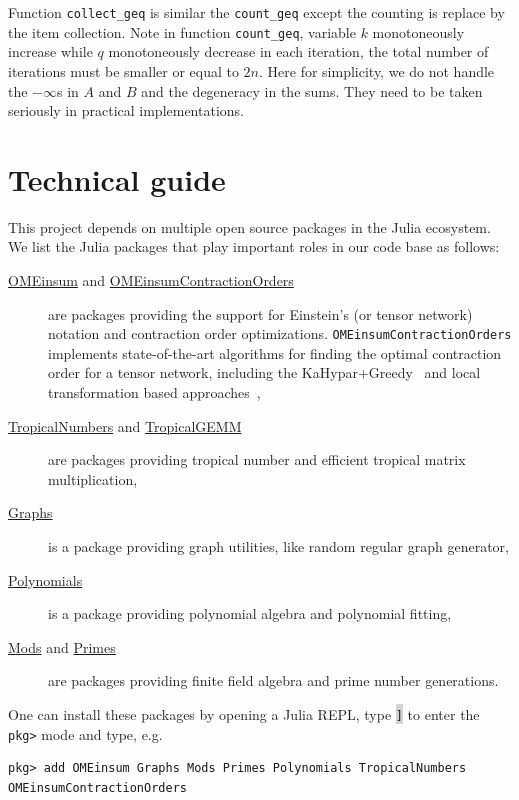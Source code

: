 \documentclass[onefignum, onetabnum]{siamart190516}
\newcommand{\<}{\langle}
\renewcommand{\>}{\rangle}
\begin{document}
Function \texttt{collect\_geq} is similar the \texttt{count\_geq} except the counting is replace by the item collection.
Note in function \texttt{count\_geq}, variable $k$ monotoneously increase while $q$ monotoneously decrease in each iteration,
the total number of iterations must be smaller or equal to $2n$.
Here for simplicity, we do not handle the $-\infty$s in $A$ and $B$ and the degeneracy in the sums.
They need to be taken seriously in practical implementations.

\section{Technical guide}\label{sec:technical}
This project depends on multiple open source packages in the Julia ecosystem.
We list the Julia packages that play important roles in our code base as follows:

\begin{description}
	\item[\href{https://github.com/under-Peter/OMEinsum.jl}{OMEinsum} and \href{https://github.com/Happy-Diode/OMEinsumContractionOrders.jl}{OMEinsumContractionOrders}] are packages providing the support for Einstein's (or tensor network) notation and contraction order optimizations.
    \texttt{OMEinsumContractionOrders} implements state-of-the-art algorithms for finding the optimal contraction order for a tensor network, including the KaHypar+Greedy~\cite{Gray2021, Pan2021} and local transformation based approaches~\cite{Kalachev2021},
	\item[\href{https://github.com/TensorBFS/TropicalNumbers.jl}{TropicalNumbers} and \href{https://github.com/TensorBFS/TropicalGEMM.jl}{TropicalGEMM}] are packages providing tropical number and efficient tropical matrix multiplication,
	\item[\href{https://github.com/JuliaGraphs/Graphs.jl}{Graphs}] is a package providing graph utilities, like random regular graph generator,
	\item[\href{https://github.com/JuliaMath/Polynomials.jl}{Polynomials}] is a package providing polynomial algebra and polynomial fitting,
	\item[\href{https://github.com/scheinerman/Mods.jl}{Mods} and \href{https://github.com/JuliaMath/Primes.jl}{Primes}] are packages providing finite field algebra and prime number generations.
\end{description}

One can install these packages by opening a Julia REPL, type \colorbox{lightgray}{\texttt{]}} to enter the \texttt{pkg>} mode and type, e.g.
\begin{lstlisting}
pkg> add OMEinsum Graphs Mods Primes Polynomials TropicalNumbers OMEinsumContractionOrders
\end{lstlisting}
\end{document}
